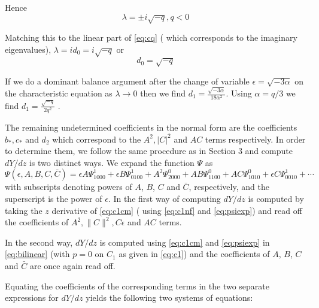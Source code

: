 Hence
\begin{equation}
\lambda = \pm i \sqrt{-q}, q < 0
\end{equation}

Matching this to the linear part of \eqref{eq:cq} ( which corresponds to the imaginary eigenvalues), $\lambda = i d_0 = i \sqrt{-q}$ or 
\begin{equation}
d_0 = \sqrt{-q}
\end{equation}


If we do a dominant balance argument after the change of variable $\epsilon = \sqrt{-3 \alpha}$ on the characteristic equation as $\lambda \rightarrow 0 $ then we find $d_1 = \frac{ \sqrt{-3 \alpha} }{18 \alpha^2 } $. Using $\alpha=q/3$ we find $d_1 = \frac{\sqrt{-q}}{2 q^2} $ .

The remaining undetermined coefficients  in the normal form are the 
coefficients $b_*,c_*$ and $d_2$ 
which correspond to the $A^2, |C|^2$ and $AC$ terms respectively. In 
order to determine them, we follow the same procedure as 
in Section 3 and compute $dY/dz$ is two distinct ways. We expand the
function $\Psi$ as
\begin{equation}\label{eq:psiexp}
\Psi(\epsilon,A,B,C,\bar{C}) = \epsilon A \Psi_{1000}^1 + \epsilon B \Psi_{0100}^1 + A^2 \Psi_{2000}^0 + A B \Psi_{1100}^0 + A C \Psi_{1010}^0 + \epsilon C \Psi_{0010}^1 + \cdots 
\end{equation}
with subscripts denoting powers of $A$, $B$, $C$ and $\bar{C}$, respectively,
and the superscript is the power of $\epsilon$. In the first way of computing
$dY/dz$ is computed by taking the $z$ derivative of \eqref{eq:c1cm} ( 
using \eqref{eq:c1nf} and \eqref{eq:psiexp}) and read off the coefficients
of $A^2, \|C\|^2, C \epsilon$ and $AC$ terms.

In the second way, $dY/dz$ is computed using 
\eqref{eq:c1cm} and \eqref{eq:psiexp} in \eqref{eq:bilinear} 
(with $p=0$ on $C_1$ as given in \eqref{eq:c1})
and the coefficients of  $A$, $B$, $C$ and $\bar{C}$ are once
again read off.

Equating the coefficients of the corresponding terms in the two
separate expressions for $dY/dz$ yields the following two systems of equations:

